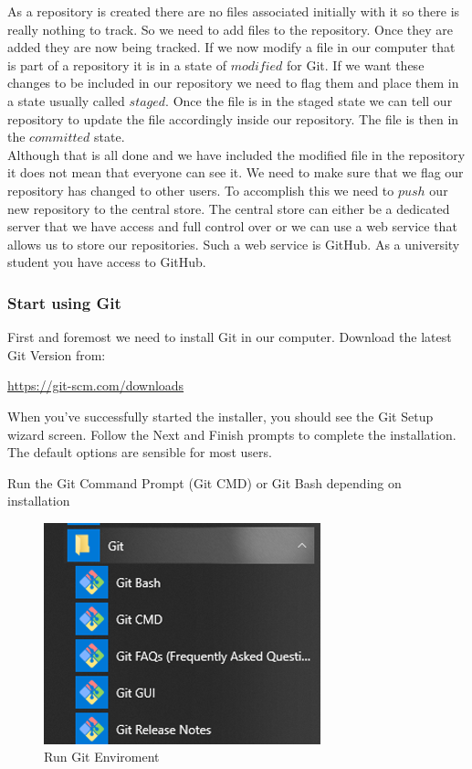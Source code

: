 \documentclass[
]{book}
\theoremstyle{definition}
\theoremstyle{definition}
\theoremstyle{definition}
\theoremstyle{remark}
\begin{document}
As a repository is created there are no files associated initially with it so there is really nothing to track. So we need to add files to the repository. Once they are added they are now being tracked. If we now modify a file in our computer that is part of a repository it is in a state of \(modified\) for Git. If we want these changes to be included in our repository we need to flag them and place them in a state usually called \(staged\). Once the file is in the staged state we can tell our repository to update the file accordingly inside our repository. The file is then in the \(committed\) state.\\
Although that is all done and we have included the modified file in the repository it does not mean that everyone can see it. We need to make sure that we flag our repository has changed to other users. To accomplish this we need to \(push\) our new repository to the central store.
The central store can either be a dedicated server that we have access and full control over or we can use a web service that allows us to store our repositories. Such a web service is GitHub.
As a university student you have access to GitHub.

\hypertarget{start-using-git}{%
\subsubsection*{Start using Git}\label{start-using-git}}

First and foremost we need to install Git in our computer. Download the latest Git Version from:

\url{https://git-scm.com/downloads}

When you've successfully started the installer, you should see the Git Setup wizard screen. Follow the Next and Finish prompts to complete the installation. The default options are sensible for most users.

Run the Git Command Prompt (Git CMD) or Git Bash depending on installation

\begin{figure}

{\centering \includegraphics[width=0.6\linewidth]{images/Git folder} 

}

\caption{Run Git Enviroment}\label{fig:unnamed-chunk-5}
\end{figure}
\end{document}
